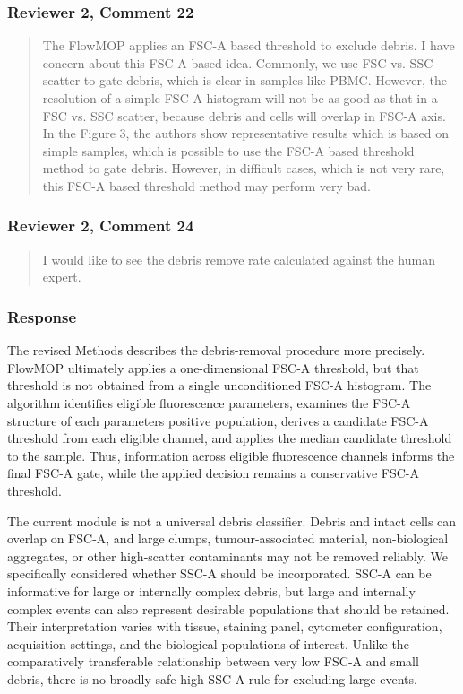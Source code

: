 \documentclass[
  11pt,
  a4paper,
]{article}
\begin{document}
\subsubsection{Reviewer 2, Comment 22}\label{reviewer-2-comment-22}

\begin{quote}
The FlowMOP applies an FSC-A based threshold to exclude debris. I have
concern about this FSC-A based idea. Commonly, we use FSC vs. SSC
scatter to gate debris, which is clear in samples like PBMC. However,
the resolution of a simple FSC-A histogram will not be as good as that
in a FSC vs. SSC scatter, because debris and cells will overlap in FSC-A
axis. In the Figure 3, the authors show representative results which is
based on simple samples, which is possible to use the FSC-A based
threshold method to gate debris. However, in difficult cases, which is
not very rare, this FSC-A based threshold method may perform very bad.
\end{quote}

\subsubsection{Reviewer 2, Comment 24}\label{reviewer-2-comment-24}

\begin{quote}
I would like to see the debris remove rate calculated against the human
expert.
\end{quote}

\subsubsection{Response}\label{response-9}

The revised Methods describes the debris-removal procedure more
precisely. FlowMOP ultimately applies a one-dimensional FSC-A threshold,
but that threshold is not obtained from a single unconditioned FSC-A
histogram. The algorithm identifies eligible fluorescence parameters,
examines the FSC-A structure of each parameter\textquotesingle s
positive population, derives a candidate FSC-A threshold from each
eligible channel, and applies the median candidate threshold to the
sample. Thus, information across eligible fluorescence channels informs
the final FSC-A gate, while the applied decision remains a conservative
FSC-A threshold.

The current module is not a universal debris classifier. Debris and
intact cells can overlap on FSC-A, and large clumps, tumour-associated
material, non-biological aggregates, or other high-scatter contaminants
may not be removed reliably. We specifically considered whether SSC-A
should be incorporated. SSC-A can be informative for large or internally
complex debris, but large and internally complex events can also
represent desirable populations that should be retained. Their
interpretation varies with tissue, staining panel, cytometer
configuration, acquisition settings, and the biological populations of
interest. Unlike the comparatively transferable relationship between
very low FSC-A and small debris, there is no broadly safe high-SSC-A
rule for excluding large events.
\end{document}
